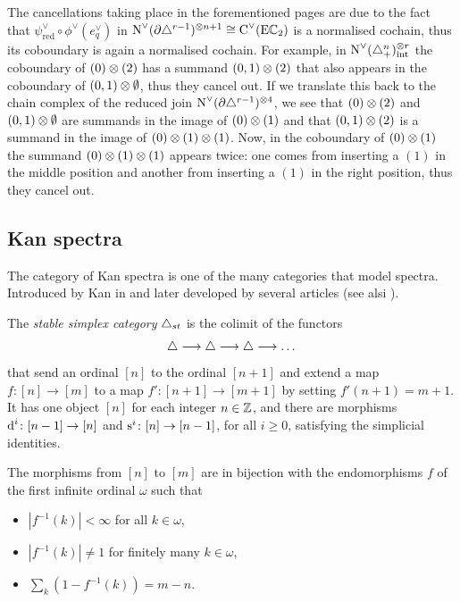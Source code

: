 \begin{remark}
	The cancellations taking place in the forementioned pages are due to the fact that $\psi_{\mathrm{red}}^\vee \circ \phi^\vee(e_q^\vee)$ in $\operatorname{N}^\vee_{}(\partial\triangle^{r-1})^{\otimes n+1}\cong \operatorname{C}^\vee_{}(\mathrm{E}\mathbb{C}_2)$ is a normalised cochain, thus its coboundary is again a normalised cochain. For example, in $\operatorname{N}^\vee_{}(\triangle_{+}^{n})^{\otimes r}_{\mathrm{int}}$ the coboundary of $(0)\otimes (2)$ has a summand $(0,1)\otimes (2)$ that also appears in the coboundary of $(0,1)\otimes\emptyset$, thus they cancel out. If we translate this back to the chain complex of the reduced join $\operatorname{N}^\vee_{}(\partial\triangle^{r-1})^{\otimes 4}$, we see that $(0)\otimes (2)$ and $(0,1)\otimes\emptyset$ are summands in the image of $(0)\otimes (1)$ and that $(0,1)\otimes (2)$ is a summand in the image of $(0)\otimes (1)\otimes(1)$. Now, in the coboundary of $(0)\otimes (1)$ the summand $(0)\otimes (1)\otimes(1)$ appears twice: one comes from inserting a $(1)$ in the middle position and another from inserting a $(1)$ in the right position, thus they cancel out.
\end{remark}

\subsection{Kan spectra} \label{s:9Kanspectra}

The category of Kan spectra is one of the many categories that model spectra. Introduced by Kan in \cite{Kan1963} and later developed by several articles \cite{burghelea_kanspectraI1967, burghelea_kanspectraII_1968, burghelea_kanspectraIII1969,Brown1973} (see alsi \cite{Stephan2015, CKP2023}).

\begin{definition}
	The \emph{stable simplex category} $\triangle_{st}$ is the colimit of the functors
	\[
	\triangle \longrightarrow \triangle \longrightarrow \triangle \longrightarrow \dots
	\]
	that send an ordinal $[n]$ to the ordinal $[n+1]$ and extend a map $f \colon [n] \to [m]$ to a map $f' \colon [n+1] \to [m+1]$ by setting $f'(n+1) = m+1$. It has one object $[n]$ for each integer $n\in \mathbb{Z}$, and there are morphisms $\operatorname{d}^i \colon [n-1] \to [n]$ and $\operatorname{s}^i \colon [n] \to [n-1]$, for all $i \geq 0$, satisfying the simplicial identities.
\end{definition}

The morphisms from $[n]$ to $[m]$ are in bijection with the endomorphisms $f$ of the first infinite ordinal $\omega$ such that
\begin{itemize}
	\item $|f^{-1}(k)|<\infty$ for all $k\in \omega$,
	\item $|f^{-1}(k)|\neq 1$ for finitely many $k\in \omega$,
	\item $\sum_k (1-f^{-1}(k)) = m-n$.
\end{itemize}

